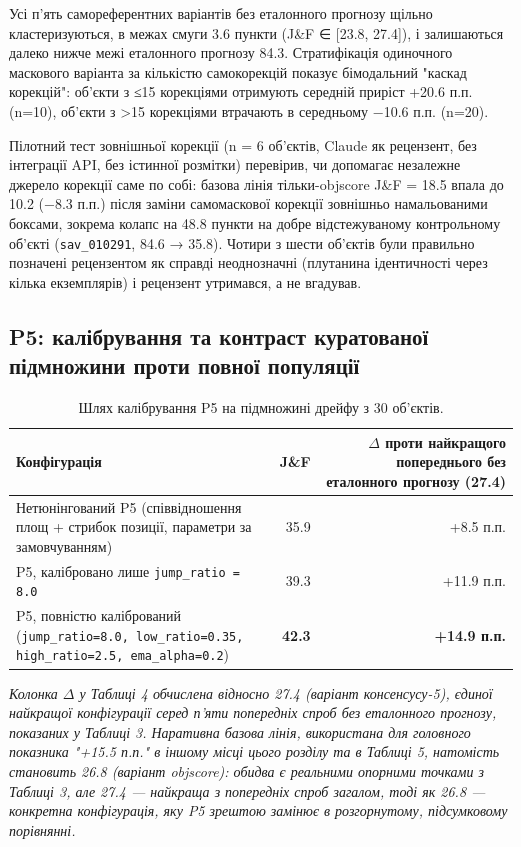 \documentclass[11pt]{article}
\begin{document}
Усі п'ять самореферентних варіантів без еталонного прогнозу щільно кластеризуються, в межах смуги 3.6 пункти (J\&F ∈ [23.8, 27.4]), і залишаються далеко нижче межі еталонного прогнозу 84.3. Стратифікація одиночного маскового варіанта за кількістю самокорекцій показує бімодальний "каскад корекцій": об'єкти з ≤15 корекціями отримують середній приріст +20.6 п.п. (n=10), об'єкти з >15 корекціями втрачають в середньому −10.6 п.п. (n=20).

Пілотний тест зовнішньої корекції (n = 6 об'єктів, Claude як рецензент, без інтеграції API, без істинної розмітки) перевірив, чи допомагає незалежне джерело корекції саме по собі: базова лінія тільки-objscore J\&F = 18.5 впала до 10.2 (−8.3 п.п.) після заміни самомаскової корекції зовнішньо намальованими боксами, зокрема колапс на 48.8 пункти на добре відстежуваному контрольному об'єкті (\texttt{sav\_010291}, 84.6 → 35.8). Чотири з шести об'єктів були правильно позначені рецензентом як справді неоднозначні (плутанина ідентичності через кілька екземплярів) і рецензент утримався, а не вгадував.

\subsection{P5: калібрування та контраст куратованої підмножини проти повної популяції}

\begin{table}[!htbp]
\centering
\caption{Шлях калібрування P5 на підмножині дрейфу з 30 об'єктів.}
\label{tab:4}
\small
\begin{tabularx}{\textwidth}{@{}LrR@{}}
\toprule
Конфігурація & J\&F & $\Delta$ проти найкращого попереднього без еталонного прогнозу (27.4) \\
\midrule
Нетюнінгований P5 (співвідношення площ + стрибок позиції, параметри за замовчуванням) & 35.9 & +8.5 п.п. \\
P5, калібровано лише \texttt{jump\_ratio = 8.0} & 39.3 & +11.9 п.п. \\
P5, повністю калібрований (\texttt{jump\_ratio=8.0, low\_ratio=0.35, high\_ratio=2.5, ema\_alpha=0.2}) & \textbf{42.3} & \textbf{+14.9 п.п.} \\
\bottomrule
\end{tabularx}
\end{table}

\emph{Колонка $\Delta$ у Таблиці 4 обчислена відносно 27.4 (варіант консенсусу-5), єдиної найкращої конфігурації серед п'яти попередніх спроб без еталонного прогнозу, показаних у Таблиці 3. Наративна базова лінія, використана для головного показника "+15.5 п.п." в іншому місці цього розділу та в Таблиці 5, натомість становить 26.8 (варіант objscore): обидва є реальними опорними точками з Таблиці 3, але 27.4 --- найкраща з попередніх спроб загалом, тоді як 26.8 --- конкретна конфігурація, яку P5 зрештою замінює в розгорнутому, підсумковому порівнянні.}
\end{document}

